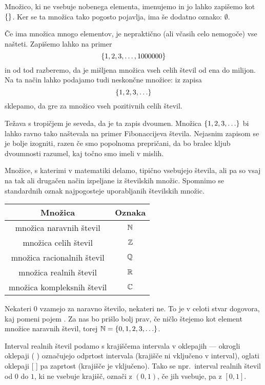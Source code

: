 		Množico, ki ne vsebuje nobenega elementa, imenujemo  in jo lahko zapišemo kot $\set{}$. Ker se ta množica tako pogosto pojavlja, ima še dodatno oznako: $\emptyset$.
		
		Če ima množica mnogo elementov, je nepraktično (ali včasih celo nemogoče) vse našteti. Zapišemo lahko na primer
		\[\set{1, 2, 3, \ldots, 1000000}\]
		in od tod razberemo, da je mišljena množica vseh celih števil od ena do milijon. Na ta način lahko podajamo tudi neskončne množice: iz zapisa
		\[\set{1, 2, 3, \ldots}\]
		sklepamo, da gre za množico vseh pozitivnih celih števil.
		
		Težava s tropičjem je seveda, da je ta zapis dvoumen. Množica $\set{1, 2, 3, \ldots}$ bi lahko ravno tako naštevala na primer Fibonaccijeva števila. Nejasnim zapisom se je bolje izogniti, razen če smo popolnoma prepričani, da bo bralec kljub dvoumnosti razumel, kaj točno smo imeli v mislih.
		
		Množice, s katerimi v matematiki delamo, tipično vsebujejo števila, ali pa so vsaj na tak ali drugačen način izpeljane iz številskih množic. Spomnimo se standardnih oznak najpogosteje uporabljanih številskih množic.
		\begin{center}
			\begin{tabular}{|cc|}
				\hline
				\textbf{Množica} & \textbf{Oznaka} \\
				\hline
				množica naravnih števil & $\mathbb{N}$ \\
				množica celih števil & $\mathbb{Z}$ \\
				množica racionalnih števil & $\mathbb{Q}$ \\
				množica realnih števil & $\mathbb{R}$ \\
				množica kompleksnih števil & $\mathbb{C}$ \\
				\hline
			\end{tabular}
		\end{center}
		
		Nekateri $0$ vzamejo za naravno število, nekateri ne. To je v celoti stvar dogovora, kaj pomeni pojem . Za nas bo prišlo bolj prav, če ničlo štejemo kot element množice naravnih števil, torej $\NN = \set{0, 1, 2, 3, \ldots}$.
		
		Interval realnih števil podamo s krajiščema intervala v oklepajih --- okrogli oklepaji ( ) označujejo odprtost intervala (krajišče ni vključeno v interval), oglati oklepaji [ ] pa zaprtost (krajišče je vključeno). Tako se npr.~interval realnih števil od $0$ do $1$, ki ne vsebuje krajišč, označi z $(0, 1)$, če jih vsebuje, pa z $[0, 1]$.
		
